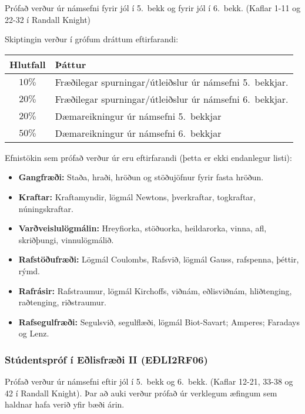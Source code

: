 Prófað verður úr námsefni fyrir jól í 5.~bekk og fyrir jól í 6.~bekk. (Kaflar 1-11 og 22-32 í Randall Knight)

Skiptingin verður í grófum dráttum eftirfarandi:

\begin{table}[H]
    \centering
    \begin{tabular}{|c|l|}
    \hline
        Hlutfall & \hspace{0.75cm}Þáttur \\ \hline \hline
        $10 \%$ & Fræðilegar spurningar/útleiðslur úr námsefni 5.~bekkjar. \\ \hline
        $20 \%$ & Fræðilegar spurningar/útleiðslur úr námsefni 6.~bekkjar. \\ \hline
        $20 \%$ & Dæmareikningur úr námsefni 5.~bekkjar \\ \hline
        $50 \%$ & Dæmareikningur úr námsefni 6.~bekkjar \\ \hline
    \end{tabular}
\end{table}


Efnistökin sem prófað verður úr eru eftirfarandi (þetta er ekki endanlegur listi):

\begin{itemize}
    \item \textbf{Gangfræði:} Staða, hraði, hröðun og stöðujöfnur fyrir fasta hröðun.
    \item \textbf{Kraftar:} Kraftamyndir, lögmál Newtons, þverkraftar, togkraftar, núningskraftar.
    \item \textbf{Varðveislulögmálin:} Hreyfiorka, stöðuorka, heildarorka, vinna, afl, skriðþungi, vinnulögmálið.
    \item \textbf{Rafstöðufræði:} Lögmál Coulombs, Rafsvið, lögmál Gauss, rafspenna, þéttir, rýmd.
    \item \textbf{Rafrásir:} Rafstraumur, lögmál Kirchoffs, viðnám, eðlisviðnám, hliðtenging, raðtenging, riðstraumur.
    \item \textbf{Rafsegulfræði:} Segulsvið, segulflæði, lögmál Biot-Savart; Amperes; Faradays og Lenz. 
\end{itemize}



\subsubsection*{Stúdentspróf í Eðlisfræði II (EÐLI2RF06)}

Prófað verður úr námsefni eftir jól í 5.~bekk og 6.~bekk. (Kaflar 12-21, 33-38 og 42 í Randall Knight). Þar að auki verður prófað úr verklegum æfingum sem haldnar hafa verið yfir bæði árin.

